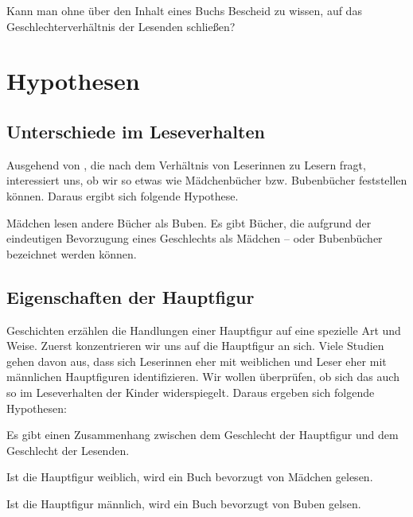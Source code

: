 \begin{frage}\label{fra:merkmale} Kann man ohne über den Inhalt eines Buchs Bescheid zu wissen, auf das Geschlechterverhältnis der Lesenden schließen? \end{frage}

\section{Hypothesen}

\subsection{Unterschiede im Leseverhalten}

Ausgehend von , die nach dem Verhältnis von Leserinnen
zu Lesern fragt, interessiert uns, ob wir so etwas wie Mädchenbücher
bzw. Bubenbücher feststellen können. Daraus ergibt sich folgende
Hypothese.

\begin{hyp}\label{hyp:andere}
Mädchen lesen andere Bücher als Buben. Es gibt Bücher, die aufgrund der eindeutigen Bevorzugung eines Geschlechts als Mädchen – oder Bubenbücher bezeichnet werden können. \end{hyp}

\subsection{Eigenschaften der Hauptfigur}

Geschichten erzählen die Handlungen einer Hauptfigur auf eine spezielle
Art und Weise. Zuerst konzentrieren wir uns auf die Hauptfigur an sich.
Viele Studien gehen davon aus, dass sich Leserinnen eher mit weiblichen
und Leser eher mit männlichen Hauptfiguren identifizieren. Wir wollen
überprüfen, ob sich das auch so im Leseverhalten der Kinder
widerspiegelt. Daraus ergeben sich folgende Hypothesen:

\begin{hyp}\label{h2} Es gibt einen Zusammenhang zwischen dem Geschlecht der Hauptfigur und dem Geschlecht der Lesenden. \end{hyp}

\begin{subhyp}\label{h2.1} Ist die Hauptfigur weiblich, wird ein Buch bevorzugt von Mädchen gelesen. \end{subhyp}

\begin{subhyp}\label{h2.2} Ist die Hauptfigur männlich, wird ein Buch bevorzugt von Buben gelsen. \end{subhyp}

